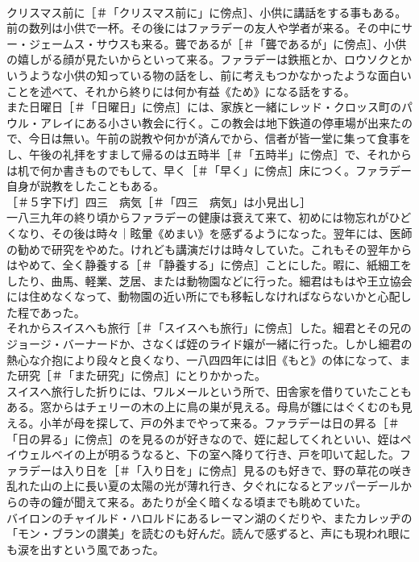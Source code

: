 \documentclass[8pt]{extreport}
\begin{document}
\begin{CJK}{UTF8}{min}
\\	クリスマス前に［＃「クリスマス前に」に傍点］、小供に講話をする事もある。前の数列は小供で一杯。その後にはファラデーの友人や学者が来る。その中にサー・ジェームス・サウスも来る。聾であるが［＃「聾であるが」に傍点］、小供の嬉しがる顔が見たいからといって来る。ファラデーは鉄瓶とか、ロウソクとかいうような小供の知っている物の話をし、前に考えもつかなかったような面白いことを述べて、それから終りには何か有益《ため》になる話をする。
\\	また日曜日［＃「日曜日」に傍点］には、家族と一緒にレッド・クロッス町のパウル・アレイにある小さい教会に行く。この教会は地下鉄道の停車場が出来たので、今日は無い。午前の説教や何かが済んでから、信者が皆一堂に集って食事をし、午後の礼拝をすまして帰るのは五時半［＃「五時半」に傍点］で、それからは机で何か書きものでもして、早く［＃「早く」に傍点］床につく。ファラデー自身が説教をしたこともある。
\\	［＃５字下げ］四三　病気［＃「四三　病気」は小見出し］
\\	一八三九年の終り頃からファラデーの健康は衰えて来て、初めには物忘れがひどくなり、その後は時々｜眩暈《めまい》を感ずるようになった。翌年には、医師の勧めで研究をやめた。けれども講演だけは時々していた。これもその翌年からはやめて、全く静養する［＃「静養する」に傍点］ことにした。暇に、紙細工をしたり、曲馬、軽業、芝居、または動物園などに行った。細君はもはや王立協会には住めなくなって、動物園の近い所にでも移転しなければならないかと心配した程であった。
\\	それからスイスへも旅行［＃「スイスへも旅行」に傍点］した。細君とその兄のジョージ・バーナードか、さなくば姪のライド嬢が一緒に行った。しかし細君の熱心な介抱により段々と良くなり、一八四四年には旧《もと》の体になって、また研究［＃「また研究」に傍点］にとりかかった。
\\	スイスへ旅行した折りには、ワルメールという所で、田舎家を借りていたこともある。窓からはチェリーの木の上に鳥の巣が見える。母鳥が雛にはぐくむのも見える。小羊が母を探して、戸の外までやって来る。ファラデーは日の昇る［＃「日の昇る」に傍点］のを見るのが好きなので、姪に起してくれといい、姪はペイウェルベイの上が明るうなると、下の室へ降りて行き、戸を叩いて起した。ファラデーは入り日を［＃「入り日を」に傍点］見るのも好きで、野の草花の咲き乱れた山の上に長い夏の太陽の光が薄れ行き、夕ぐれになるとアッパーデールからの寺の鐘が聞えて来る。あたりが全く暗くなる頃までも眺めていた。
\\	バイロンのチャイルド・ハロルドにあるレーマン湖のくだりや、またカレッヂの「モン・ブランの讃美」を読むのも好んだ。読んで感ずると、声にも現われ眼にも涙を出すという風であった。

\end{CJK}
\end{document}
